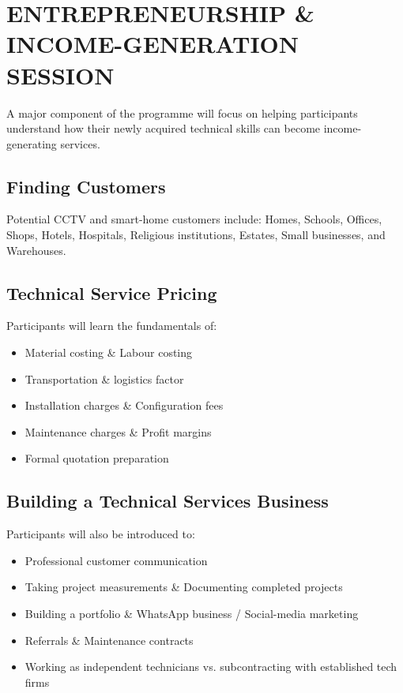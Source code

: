 \documentclass[11pt,a4paper]{article}
\begin{document}
\section{ENTREPRENEURSHIP \& INCOME-GENERATION SESSION}
A major component of the programme will focus on helping participants understand how their newly acquired technical skills can become income-generating services.

\subsection{Finding Customers}
Potential CCTV and smart-home customers include:
Homes, Schools, Offices, Shops, Hotels, Hospitals, Religious institutions, Estates, Small businesses, and Warehouses.

\subsection{Technical Service Pricing}
Participants will learn the fundamentals of:
\begin{itemize}
    \item Material costing \& Labour costing
    \item Transportation \& logistics factor
    \item Installation charges \& Configuration fees
    \item Maintenance charges \& Profit margins
    \item Formal quotation preparation
\end{itemize}

\subsection{Building a Technical Services Business}
Participants will also be introduced to:
\begin{itemize}
    \item Professional customer communication
    \item Taking project measurements \& Documenting completed projects
    \item Building a portfolio \& WhatsApp business / Social-media marketing
    \item Referrals \& Maintenance contracts
    \item Working as independent technicians vs. subcontracting with established tech firms
\end{itemize}
\end{document}
